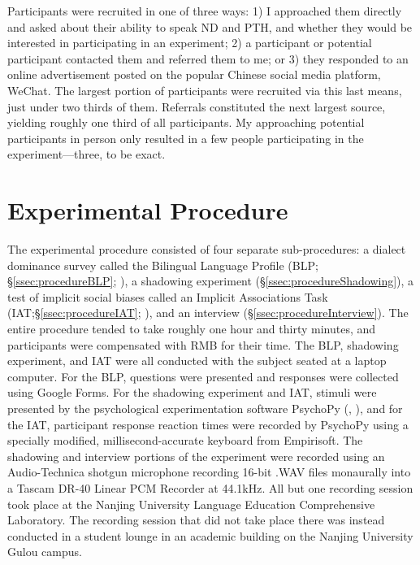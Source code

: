 Participants were recruited in one of three ways: 1) I approached them directly and asked about their ability to speak ND and PTH, and whether they would be interested in participating in an experiment; 2) a participant or potential participant contacted them and referred them to me; or 3) they responded to an online advertisement posted on the popular Chinese social media platform, WeChat. The largest portion of participants were recruited via this last means, just under two thirds of them. Referrals constituted the next largest source, yielding roughly one third of all participants. My approaching potential participants in person only resulted in a few people participating in the experiment---three, to be exact. 
% 
% 
% 
% 

\section{Experimental Procedure}
\label{sec:procedure}
The experimental procedure consisted of four separate sub-procedures: a dialect dominance survey called the Bilingual Language Profile (BLP; \S\ref{ssec:procedureBLP}; \citealt{birdsong2012bilingual}), a shadowing experiment (\S\ref{ssec:procedureShadowing}), a test of implicit social biases called an Implicit Associations Task (IAT;\S\ref{ssec:procedureIAT}; \citealt{greenwald1998measuring,greenwald2003understanding}), and an interview (\S\ref{ssec:procedureInterview}). The entire procedure tended to take roughly one hour and thirty minutes, and participants were compensated with RMB  for their time.  The BLP, shadowing experiment, and IAT were all conducted with the subject seated at a laptop computer. For the BLP, questions were presented and responses were collected using Google Forms. For the shadowing experiment and IAT, stimuli were presented by the psychological experimentation software PsychoPy (\cite{peirce2007psychopy}, \cite{peirce2009generating}), and for the IAT, participant response reaction times were recorded by PsychoPy using a specially modified, millisecond-accurate keyboard from Empirisoft. The shadowing and interview portions of the experiment were recorded using an Audio-Technica shotgun microphone recording 16-bit .WAV files monaurally into a Tascam DR-40 Linear PCM Recorder at 44.1kHz. All but one recording session took place at the Nanjing University Language Education Comprehensive Laboratory. The recording session that did not take place there was instead conducted in a student lounge in an academic building on the Nanjing University Gulou campus.

